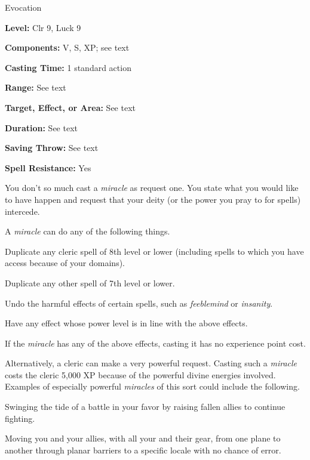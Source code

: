 
Evocation

\textbf{Level:} Clr 9, Luck 9

\textbf{Components:} V, S, XP; see text

\textbf{Casting Time:} 1 standard action

\textbf{Range:} See text

\textbf{Target, Effect, or Area:} See text

\textbf{Duration:} See text

\textbf{Saving Throw:} See text

\textbf{Spell Resistance:} Yes

You don't so much cast a \textit{miracle} as request one. You state what you would 
like to have happen and request that your deity (or the power you pray to for spells) 
intercede.

A \textit{miracle} can do any of the following things.%

Duplicate any cleric spell of 8th level or lower (including spells to which you 
have access because of your domains). %

Duplicate any other spell of 7th level or lower.%

Undo the harmful effects of certain spells, such as \textit{feeblemind} or \textit{insanity}.%

Have any effect whose power level is in line with the above effects.

If the \textit{miracle} has any of the above effects, casting it has no experience 
point cost.

Alternatively, a cleric can make a very powerful request. Casting such a \textit{miracle 
}costs the cleric 5,000 XP because of the powerful divine energies involved. Examples 
of especially powerful \textit{miracles} of this sort could include the following.%

Swinging the tide of a battle in your favor by raising fallen allies to continue 
fighting.%

Moving you and your allies, with all your and their gear, from one plane to another 
through planar barriers to a specific locale with no chance of error.%

